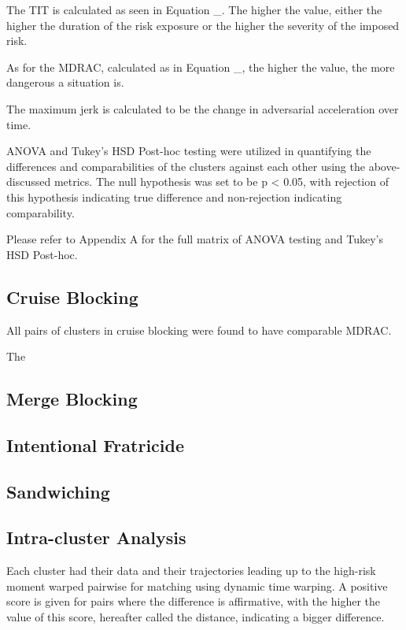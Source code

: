 \documentclass[12pt, a4paper]{report}
\begin{document}
The TIT is calculated as seen in Equation _. The higher the value, either the higher the duration of the risk exposure or the higher the severity of the imposed risk.

As for the MDRAC, calculated as in Equation _, the higher the value, the more dangerous a situation is.

The maximum jerk is calculated to be the change in adversarial acceleration over time.

ANOVA and Tukey’s HSD Post-hoc testing were utilized in quantifying the differences and comparabilities of the clusters against each other using the above-discussed metrics. The null hypothesis was set to be p < 0.05, with rejection of this hypothesis indicating true difference and non-rejection indicating comparability.

Please refer to Appendix A for the full matrix of ANOVA testing and Tukey’s HSD Post-hoc.

\subsection{Cruise Blocking}

All pairs of clusters in cruise blocking were found to have comparable MDRAC. 

The 

\subsection{Merge Blocking}

\subsection{Intentional Fratricide}

\subsection{Sandwiching}

\subsection{Intra-cluster Analysis}

Each cluster had their data and their trajectories leading up to the high-risk moment warped pairwise for matching using dynamic time warping. A positive score is given for pairs where the difference is affirmative, with the higher the value of this score, hereafter called the distance, indicating a bigger difference.
\end{document}
